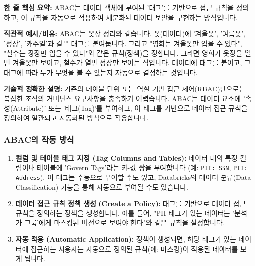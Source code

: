 \documentclass[11pt,a4paper]{article}
\begin{document}
\begin{keyconceptbox}
\textbf{한 줄 핵심 요약:} ABAC는 데이터 객체에 부여된 '태그'를 기반으로 접근 규칙을 정의하고, 이 규칙을 자동으로 적용하여 세분화된 데이터 보안을 구현하는 방식입니다.
\end{keyconceptbox}

\textbf{직관적 예시/비유:}
ABAC는 옷장 정리와 같습니다. 옷(데이터)에 '겨울옷', '여름옷', '정장', '캐주얼'과 같은 태그를 붙여둡니다. 그리고 "영희는 겨울옷만 입을 수 있다", "철수는 정장만 입을 수 있다"와 같은 규칙(정책)을 정합니다. 그러면 영희가 옷장을 열면 겨울옷만 보이고, 철수가 열면 정장만 보이는 식입니다. 데이터에 태그를 붙이고, 그 태그에 따라 누가 무엇을 볼 수 있는지 자동으로 결정하는 것입니다.

\textbf{기술적 정확한 설명:}
기존의 테이블 단위 또는 역할 기반 접근 제어(RBAC)만으로는 복잡한 조직의 거버넌스 요구사항을 충족하기 어렵습니다. ABAC는 데이터 요소에 '속성(Attribute)' 또는 '태그(Tag)'를 부여하고, 이 태그를 기반으로 데이터 접근 규칙을 정의하여 일관되고 자동화된 방식으로 적용합니다.

\subsubsection*{ABAC의 작동 방식}
\begin{enumerate}
    \item \textbf{컬럼 및 테이블 태그 지정 (Tag Columns and Tables):}
    데이터 내의 특정 컬럼이나 테이블에 'Govern Tags'라는 키-값 쌍을 부여합니다 (예: \texttt{PII: SSN}, \texttt{PII: Address}). 이 태그는 수동으로 부여할 수도 있고, Databricks의 데이터 분류(Data Classification) 기능을 통해 자동으로 부여될 수도 있습니다.
    \item \textbf{데이터 접근 규칙 정책 생성 (Create a Policy):}
    태그를 기반으로 데이터 접근 규칙을 정의하는 정책을 생성합니다. 예를 들어, "PII 태그가 있는 데이터는 '분석가 그룹'에게 마스킹된 버전으로 보여야 한다"와 같은 규칙을 설정합니다.
    \item \textbf{자동 적용 (Automatic Application):}
    정책이 생성되면, 해당 태그가 있는 데이터에 접근하는 사용자는 자동으로 정의된 규칙(예: 마스킹)이 적용된 데이터를 보게 됩니다.
\end{enumerate}
\end{document}
